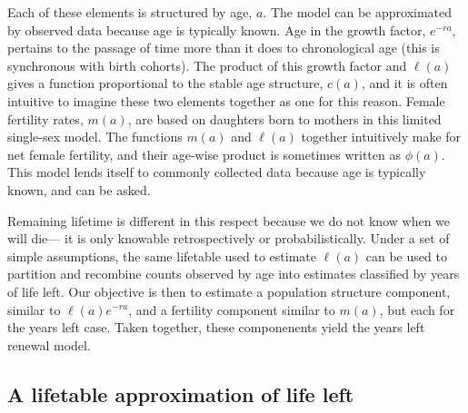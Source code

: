 \documentclass[12pt,oneside,a4paper,leqno]{article}
\begin{document}
Each of these elements is structured by
age, $a$. The model can be approximated by observed data because
age is typically known. %
Age in the growth factor, $e^{-ra}$, pertains to the passage of
time more than it does to chronological age (this is synchronous with birth
cohorts). The product of this growth factor and $\ell(a)$ gives a
function proportional to the stable age structure, $c(a)$, and it is often
intuitive to imagine these two elements together as one for this reason. Female
fertility rates, $m(a)$, are based on daughters born to mothers in this limited
single-sex model. The functions $m(a)$ and $\ell(a)$
together intuitively make for net female fertility, and their age-wise product
is sometimes written as $\phi(a)$. This model lends itself to commonly collected data because age
is typically known, and can be asked.

Remaining lifetime is different in this respect because we do not know when we
will die--- it is only knowable retrospectively or probabilistically. Under a set of simple assumptions, the same lifetable used to
estimate $\ell(a)$ can be used to
partition and recombine counts observed by age into estimates
classified by years of life left. Our objective is then to estimate a population
structure component, similar to $\ell(a)e^{-ra}$, and a fertility component
similar to $m(a)$, but each for the years left case. Taken together, these
componenents yield the years left renewal model.

\subsection*{A lifetable approximation of life left}
\end{document}
